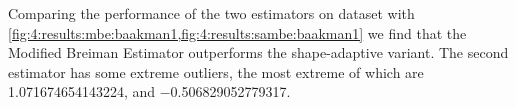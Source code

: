 	Comparing the performance of the two estimators on dataset \baakmanOne with \cref{fig:4:results:mbe:baakman1,fig:4:results:sambe:baakman1} we find that the Modified Breiman Estimator outperforms the shape-adaptive variant. The second estimator has some extreme outliers, the most extreme of which are \num{1.071674654143224}, and \num{-0.506829052779317}. 

